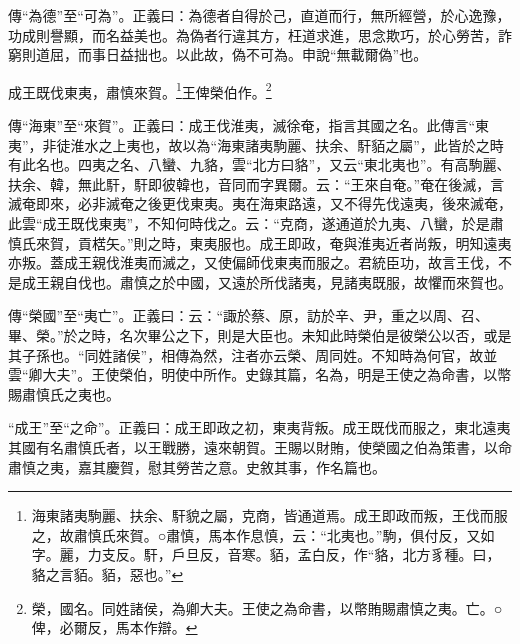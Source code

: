{\noindent\shu{}\fzkt 傳“為德”至“可為”。正義曰：為德者自得於己，直道而行，無所經營，於心逸豫，功成則譽顯，而名益美也。為偽者行違其方，枉道求進，思念欺巧，於心勞苦，詐窮則道屈，而事日益拙也。以此故，偽不可為。申說“無載爾偽”也。 \par}

成王既伐東夷，肅慎來賀。\footnote{海東諸夷駒麗、扶余、馯貌之屬，克商，皆通道焉。成王即政而叛，王伐而服之，故肅慎氏來賀。○肅慎，馬本作息慎，云：“北夷也。”駒，俱付反，又如字。麗，力支反。馯，戶旦反，音寒。貊，孟白反，作“貉，北方豸種。曰，貉之言貊。貊，惡也。”}王俾榮伯作。\footnote{榮，國名。同姓諸侯，為卿大夫。王使之為命書，以幣賄賜肅慎之夷。亡。○俾，必爾反，馬本作辯。}


{\noindent\zhuan{}\fzbyks 傳“海東”至“來賀”。正義曰：成王伐淮夷，滅徐奄，指言其國之名。此傳言“東夷”，非徒淮水之上夷也，故以為“海東諸夷駒麗、扶余、馯貊之屬”，此皆於之時有此名也。四夷之名、八蠻、九貉，雲“北方曰貉”，又云“東北夷也”。有高駒麗、扶余、韓，無此馯，馯即彼韓也，音同而字異爾。云：“王來自奄。”奄在後滅，言滅奄即來，必非滅奄之後更伐東夷。夷在海東路遠，又不得先伐遠夷，後來滅奄，此雲“成王既伐東夷”，不知何時伐之。云：“克商，遂通道於九夷、八蠻，於是肅慎氏來賀，貢楛矢。”則之時，東夷服也。成王即政，奄與淮夷近者尚叛，明知遠夷亦叛。蓋成王親伐淮夷而滅之，又使偏師伐東夷而服之。君統臣功，故言王伐，不是成王親自伐也。肅慎之於中國，又遠於所伐諸夷，見諸夷既服，故懼而來賀也。 \par}

{\noindent\zhuan{}\fzbyks 傳“榮國”至“夷亡”。正義曰：云：“諏於蔡、原，訪於辛、尹，重之以周、召、畢、榮。”於之時，名次畢公之下，則是大臣也。未知此時榮伯是彼榮公以否，或是其子孫也。“同姓諸侯”，相傳為然，注者亦云榮、周同姓。不知時為何官，故並雲“卿大夫”。王使榮伯，明使中所作。史錄其篇，名為，明是王使之為命書，以幣賜肅慎氏之夷也。 \par}

{\noindent\shu{}\fzkt “成王”至“之命”。正義曰：成王即政之初，東夷背叛。成王既伐而服之，東北遠夷其國有名肅慎氏者，以王戰勝，遠來朝賀。王賜以財賄，使榮國之伯為策書，以命肅慎之夷，嘉其慶賀，慰其勞苦之意。史敘其事，作名篇也。 \par}

